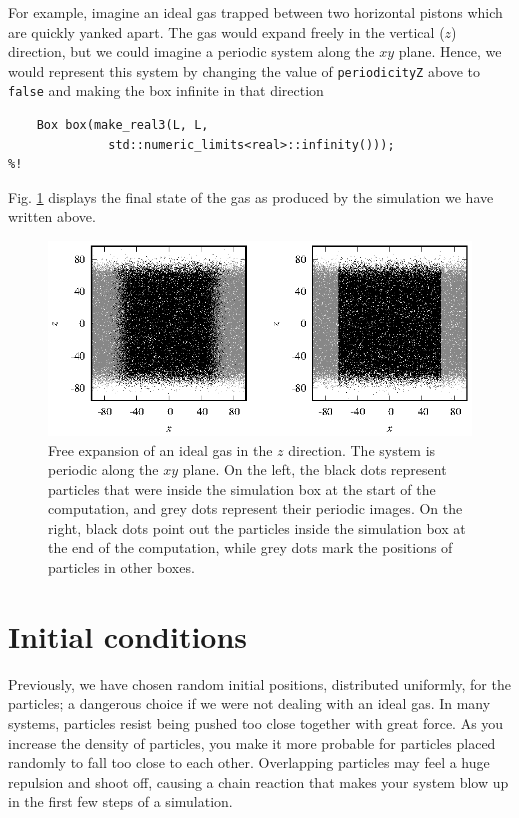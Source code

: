 For example, imagine an ideal gas trapped between two horizontal pistons which
are quickly yanked apart. The gas would expand freely in the vertical ($z$)
direction, but we could imagine a periodic system along the $xy$ plane. Hence,
we would represent this system by changing the value of \texttt{periodicityZ}
above to \texttt{false} and making the box infinite in that direction
\begin{lstlisting}
    Box box(make_real3(L, L,
              std::numeric_limits<real>::infinity()));
%!
\end{lstlisting}
Fig. \ref{free_expansion} displays the final state of
the gas as produced by the simulation we have written above.

\begin{figure}
  \includegraphics[width = \textwidth]{figures/free_expansion.eps}
  \caption{\label{free_expansion}Free expansion of an ideal gas in the $z$
           direction. The system is periodic along the $xy$ plane. On the left,
           the black dots represent particles that were inside the simulation
           box at the start of the computation, and grey dots represent their
           periodic images. On the right, black dots point out the particles
           inside the simulation box at the end of the computation, while grey
           dots mark the positions of particles in other boxes.}
\end{figure}

\section{Initial conditions}

Previously, we have chosen random initial positions, distributed uniformly, for 
the particles; a dangerous choice if we were not dealing with an ideal gas. In 
many systems, particles resist being pushed too close together with great force. 
As you increase the density of particles, you make it more probable for 
particles placed randomly to fall too close to each other. Overlapping particles 
may feel a huge repulsion and shoot off, causing a chain reaction that makes 
your system blow up in the first few steps of a simulation.


